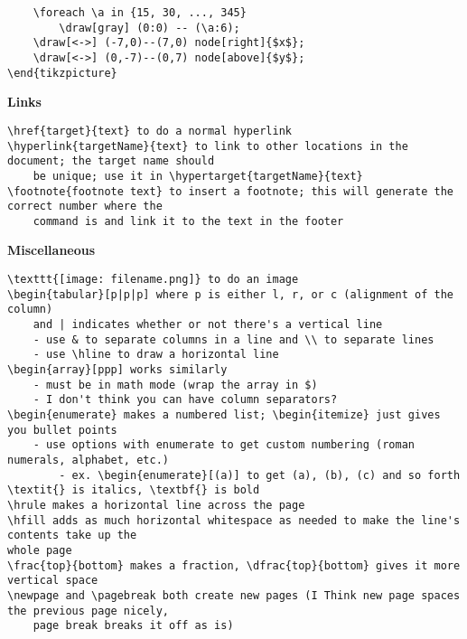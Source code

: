 \documentclass{article}
\begin{document}
\begin{flushleft}
\begin{verbatim}
    \foreach \a in {15, 30, ..., 345}
        \draw[gray] (0:0) -- (\a:6);
    \draw[<->] (-7,0)--(7,0) node[right]{$x$};
    \draw[<->] (0,-7)--(0,7) node[above]{$y$};
\end{tikzpicture}
\end{verbatim}

\textbf{Links}\\ \vspace{-11pt}
\begin{verbatim}
\href{target}{text} to do a normal hyperlink
\hyperlink{targetName}{text} to link to other locations in the document; the target name should
    be unique; use it in \hypertarget{targetName}{text}
\footnote{footnote text} to insert a footnote; this will generate the correct number where the
    command is and link it to the text in the footer
\end{verbatim}

\textbf{Miscellaneous}\\ \vspace{-11pt}
\begin{verbatim}
\texttt{[image: filename.png]} to do an image
\begin{tabular}[p|p|p] where p is either l, r, or c (alignment of the column) 
    and | indicates whether or not there's a vertical line
    - use & to separate columns in a line and \\ to separate lines
    - use \hline to draw a horizontal line
\begin{array}[ppp] works similarly
    - must be in math mode (wrap the array in $)
    - I don't think you can have column separators?
\begin{enumerate} makes a numbered list; \begin{itemize} just gives you bullet points
    - use options with enumerate to get custom numbering (roman numerals, alphabet, etc.) 
        - ex. \begin{enumerate}[(a)] to get (a), (b), (c) and so forth
\textit{} is italics, \textbf{} is bold
\hrule makes a horizontal line across the page
\hfill adds as much horizontal whitespace as needed to make the line's contents take up the
whole page
\frac{top}{bottom} makes a fraction, \dfrac{top}{bottom} gives it more vertical space
\newpage and \pagebreak both create new pages (I Think new page spaces the previous page nicely,
    page break breaks it off as is)
\end{verbatim}
\end{flushleft}
\end{document}
